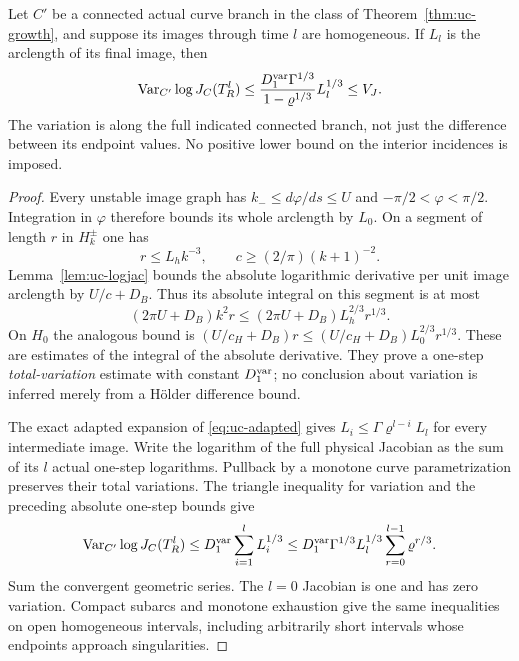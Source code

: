 \begin{lemma}
\label{lem:ab-jacobian-variation}
Let $C'$ be a connected actual curve branch in the class of
Theorem~\ref{thm:uc-growth}, and suppose its images through time $l$
are homogeneous.  If $L_l$ is the arclength of its final image, then
\begin{equation}\label{eq:ab-jacobian-variation}
 \operatorname{Var}_{C'}\log J_C(T_R^l)
 \le \frac{D_1^{\rm var}\Gamma^{1/3}}
                  {1-\varrho^{1/3}} L_l^{1/3}
 \le V_J.
\end{equation}
The variation is along the full indicated connected branch, not just
the difference between its endpoint values.  No positive lower bound
on the interior incidences is imposed.
\end{lemma}
\begin{proof}
Every unstable image graph has $k_-\le d\varphi/ds\le U$ and
$-\pi/2<\varphi<\pi/2$.  Integration in $\varphi$ therefore
bounds its whole arclength by $L_0$.  On a segment of length $r$ in
$H_k^\pm$ one has
\[
 r\le L_hk^{-3},\qquad
 c\ge (2/\pi)(k+1)^{-2}.
\]
Lemma~\ref{lem:uc-logjac} bounds the absolute logarithmic derivative
per unit image arclength by $U/c+D_B$.  Thus its absolute integral
on this segment is at most
\[
 (2\pi U+D_B)k^2r
 \le (2\pi U+D_B)L_h^{2/3}r^{1/3}.
\]
On $H_0$ the analogous bound is
$(U/c_H+D_B)r\le(U/c_H+D_B)L_0^{2/3}r^{1/3}$.
These are estimates of the integral of the absolute derivative.
They prove a one-step \emph{total-variation} estimate with constant
$D_1^{\rm var}$; no conclusion about variation is inferred merely
from a H\"older difference bound.

The exact adapted expansion of \eqref{eq:uc-adapted} gives
$L_i\le\Gamma\varrho^{l-i}L_l$ for every intermediate image.
Write the logarithm of the full physical Jacobian as the sum of
its $l$ actual one-step logarithms.  Pullback by a monotone curve
parametrization preserves their total variations.  The triangle
inequality for variation and the preceding absolute one-step bounds
give
\[
 \operatorname{Var}_{C'}\log J_C(T_R^l)
 \le D_1^{\rm var}\sum_{i=1}^l L_i^{1/3}
 \le D_1^{\rm var}\Gamma^{1/3}L_l^{1/3}
                     \sum_{r=0}^{l-1}\varrho^{r/3}.
\]
Sum the convergent geometric series.  The $l=0$ Jacobian is one
and has zero variation.  Compact subarcs and monotone exhaustion
give the same inequalities on open homogeneous intervals, including
arbitrarily short intervals whose endpoints approach singularities.
\end{proof}

